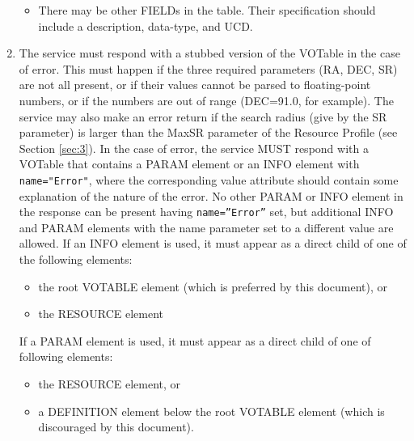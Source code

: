 \documentclass[11pt,a4paper]{ivoa}
\begin{document}
\begin{enumerate}
\begin{itemize}
		\item There may be other FIELDs in the table. Their specification should include a description, data-type, and UCD.
	\end{itemize}
	\item The service must respond with a stubbed version of the VOTable in the case of error. This must happen if the three required parameters (RA, DEC, SR) are not all present, or if their values cannot be parsed to floating-point numbers, or if the numbers are out of range (DEC=91.0, for example). The service may also make an error return if the search radius (give by the SR parameter) is larger than the MaxSR parameter of the Resource Profile (see Section \ref{sec:3}).
	In the case of error, the service MUST respond with a VOTable that contains
	a PARAM element or an INFO element with \texttt{name="Error"}, where the
	corresponding value attribute should contain some explanation of the nature
	of the error. No other PARAM or INFO element in the response can be present
	having \texttt{name=''Error''} set, but additional INFO and PARAM elements
	with the name parameter set to a different value are allowed. If an INFO element 
	is used, it must appear as a direct child of one of the following elements:
	\begin{itemize}
		\item the root VOTABLE element (which is preferred by this document), or
		\item the RESOURCE element
	\end{itemize}
	If a PARAM element is used, it must appear as a direct child of one of following elements:
	\begin{itemize}
		\item the RESOURCE element, or
		\item a DEFINITION element below the root VOTABLE element (which is discouraged by this document).
	\end{itemize}
\end{enumerate}
\end{document}
